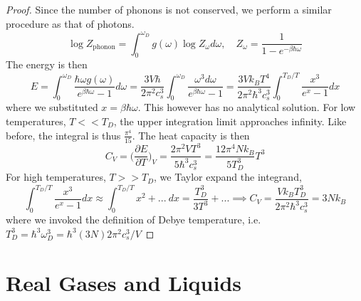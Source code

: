 \documentclass[a4paper]{article}
\theoremstyle{new}
\begin{document}
\begin{proof}
Since the number of phonons is not conserved, we perform a similar procedure as that of photons.
$$\log Z_{\text{phonon}}=\int_0^{\omega_D}g(\omega)\log Z_\omega d\omega,\quad Z_\omega=\frac{1}{1-e^{-\beta\hbar\omega}}$$
The energy is then
$$E=\int_0^{\omega_D}\frac{\hbar\omega g(\omega)}{e^{\beta\hbar\omega}-1}d\omega=\frac{3V\hbar}{2\pi^2c_s^3}\int_0^{\omega_D}\frac{\omega^3d\omega}{e^{\beta\hbar\omega}-1}=\frac{3Vk_BT^4}{2\pi^2\hbar^3c_s^3}\int_0^{T_D/T}\frac{x^3}{e^x-1}dx$$
where we substituted $x=\beta\hbar\omega$. This however has no analytical solution. For low temperatures, $T<<T_D$, the upper integration limit approaches infinity. Like before, the integral is thus $\frac{\pi^4}{15}$. The heat capacity is then
$$C_V=\bigg(\frac{\partial E}{\partial T}\bigg)_V=\frac{2\pi^2VT^3}{5\hbar^3c_s^3}=\frac{12\pi^4Nk_B}{5T_D^3}T^3$$
For high temperatures, $T>>T_D$, we Taylor expand the integrand,
$$\int_0^{T_D/T}\frac{x^3}{e^x-1}dx\approx\int_0^{T_D/T}x^2+...~dx=\frac{T_D^3}{3T^3}+...\implies C_V=\frac{Vk_BT_D^3}{2\pi^2\hbar^3c_s^3}=3Nk_B$$
where we invoked the definition of Debye temperature, i.e. $T_D^3=\hbar^3\omega_D^3=\hbar^3(3N)2\pi^2c_s^3/V$
\end{proof}
\newpage
\section{Real Gases and Liquids}
\end{document}

